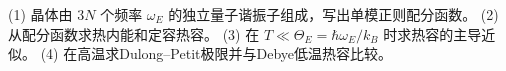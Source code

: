 (1) 晶体由 \(3N\) 个频率 \(\omega_E\) 的独立量子谐振子组成，写出单模正则配分函数。
(2) 从配分函数求热内能和定容热容。
(3) 在 \(T\ll\Theta_E=\hbar\omega_E/k_B\) 时求热容的主导近似。
(4) 在高温求Dulong–Petit极限并与Debye低温热容比较。
